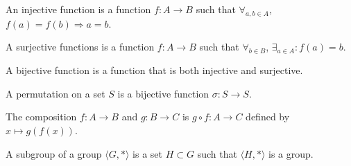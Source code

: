 \documentclass[crop=false,class=article,oneside]{standalone}
\begin{document}
            \begin{definition}
                An injective function is a function
                $f:A\rightarrow B$ such that
                $\forall_{a,b\in A}$,
                $f(a)=f(b)\Rightarrow a=b$.
            \end{definition}
            \begin{definition}
                A surjective functions is a function
                $f:A\rightarrow B$ such that
                $\forall_{b\in B}$,
                $\exists_{a\in A}:f(a)=b$.
            \end{definition}
            \begin{definition}
                A bijective function is a function that
                is both injective and surjective.
            \end{definition}
            \begin{definition}
                A permutation on a set $S$ is a
                bijective function $\sigma:S\rightarrow S$.
            \end{definition}
            \begin{definition}
                The composition $f:A\rightarrow B$ and
                $g:B\rightarrow C$ is $g\circ f:A\rightarrow C$
                defined by $x\mapsto g(f(x))$.
            \end{definition}
            \begin{definition}
                A subgroup of a group $\langle G,*\rangle$ is
                a set $H\subset G$ such that $\langle H,*\rangle$
                is a group.
            \end{definition}
\end{document}
